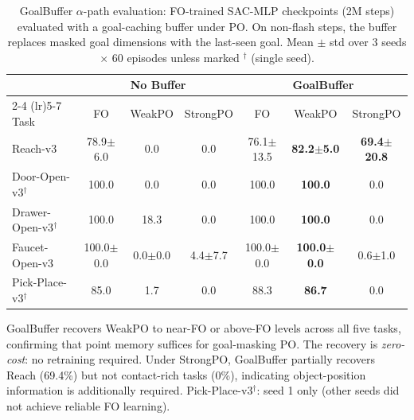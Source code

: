 \begin{table}[t]
\centering
\caption{GoalBuffer $\alpha$-path evaluation: FO-trained SAC-MLP checkpoints (2M steps) evaluated with a goal-caching buffer under PO. On non-flash steps, the buffer replaces masked goal dimensions with the last-seen goal. Mean $\pm$ std over 3 seeds $\times$ 60 episodes unless marked $^\dagger$ (single seed).}
\label{tab:goal_buffer}
\begin{tabular}{l ccc ccc}
\toprule
& \multicolumn{3}{c}{No Buffer} & \multicolumn{3}{c}{GoalBuffer} \\
\cmidrule(lr){2-4} \cmidrule(lr){5-7}
Task & FO & WeakPO & StrongPO & FO & WeakPO & StrongPO \\
\midrule
Reach-v3 & 78.9$\pm$6.0 & 0.0 & 0.0 & 76.1$\pm$13.5 & \textbf{82.2$\pm$5.0} & \textbf{69.4$\pm$20.8} \\
Door-Open-v3$^\dagger$ & 100.0 & 0.0 & 0.0 & 100.0 & \textbf{100.0} & 0.0 \\
Drawer-Open-v3$^\dagger$ & 100.0 & 18.3 & 0.0 & 100.0 & \textbf{100.0} & 0.0 \\
Faucet-Open-v3 & 100.0$\pm$0.0 & 0.0$\pm$0.0 & 4.4$\pm$7.7 & 100.0$\pm$0.0 & \textbf{100.0$\pm$0.0} & 0.6$\pm$1.0 \\
Pick-Place-v3$^\dagger$ & 85.0 & 1.7 & 0.0 & 88.3 & \textbf{86.7} & 0.0 \\
\bottomrule
\end{tabular}
\begin{flushleft}
\footnotesize GoalBuffer recovers WeakPO to near-FO or above-FO levels across all five tasks, confirming that point memory suffices for goal-masking PO. The recovery is \emph{zero-cost}: no retraining required. Under StrongPO, GoalBuffer partially recovers Reach (69.4\%) but not contact-rich tasks (0\%), indicating object-position information is additionally required. Pick-Place-v3$^\dagger$: seed 1 only (other seeds did not achieve reliable FO learning).
\end{flushleft}
\end{table}
